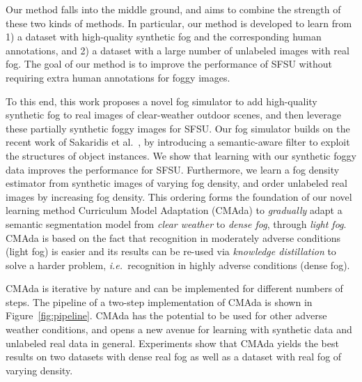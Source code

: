 \documentclass[twocolumn]{svjour3}          \smartqed  \usepackage{graphicx}
\newcommand{\ie}{\mbox{\emph{i.e.\ }}}
\begin{document}
Our method falls into the middle ground, and aims to combine the strength of these two kinds of methods. In particular, our method is developed to learn from 1) a dataset with high-quality synthetic fog and the corresponding human annotations, and 2) a dataset with a large number of unlabeled images with real fog. The goal of our method is to improve the performance of SFSU without requiring extra human annotations for foggy images.

To this end, this work proposes a novel fog simulator to add high-quality synthetic fog to real images of clear-weather outdoor scenes, and then leverage these partially synthetic foggy images for SFSU. Our fog simulator builds on the recent work of Sakaridis et al.~\cite{SFSU_synthetic}, by introducing a semantic-aware filter to exploit the structures of object instances. We show that learning with our synthetic foggy data improves the performance for SFSU. Furthermore, we learn a fog density estimator from synthetic images of varying fog density, and order unlabeled real images by increasing fog density. This ordering forms the foundation of our novel learning method Curriculum Model Adaptation (CMAda) to \emph{gradually} adapt a semantic segmentation model from \emph{clear weather} to \emph{dense fog}, through \emph{light fog}. CMAda is based on the fact that recognition in moderately adverse conditions (light fog) is easier and its results can be re-used via \emph{knowledge distillation} to solve a harder problem, \ie{}recognition in highly adverse conditions (dense fog).

CMAda is iterative by nature and can be implemented for different numbers of steps. The pipeline of a two-step implementation of CMAda is shown in Figure~\ref{fig:pipeline}. CMAda has the potential to be used for other adverse weather conditions, and opens a new avenue for learning with synthetic data and unlabeled real data in general.  
Experiments show that CMAda yields the best results on two datasets with dense real fog as well as a dataset with real fog of varying density.
\end{document}
